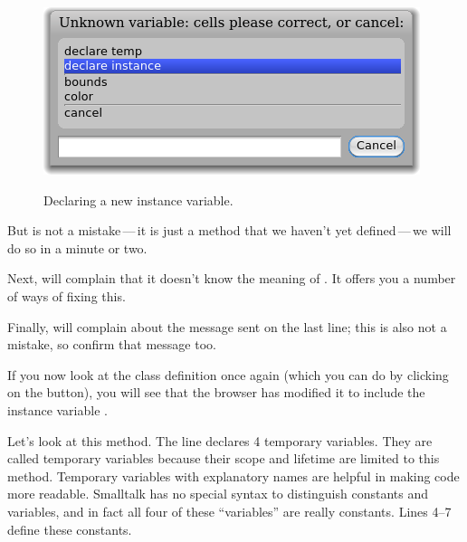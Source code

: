 \documentclass[a4paper,10pt,twoside]{book}
\begin{document}
\begin{figure}[htb]
\begin{minipage}{0.48\textwidth}
		{\includegraphics[scale=0.7]{DeclareInstanceVar}}
	\caption{Declaring a new instance variable.}
\end{minipage}
\end{figure}

But  is not a mistake\,---\,it is just a method that we haven't yet defined\,---\,we will do so in a minute or two.


Next, \pharo will complain that it doesn't know the meaning of .  It offers you a number of ways of fixing this.

Finally, \pharo will complain about the message  sent on the last line; this is also not a mistake, so confirm that message too.

If you now look at the class definition once again (which you can do by clicking on the  button), you will see that the browser has modified it to include the instance variable .

Let's look at this  method.
The line   declares 4 temporary variables. They are called temporary variables because their scope and lifetime are limited to this method.  Temporary variables with explanatory names are helpful in making code more readable.  Smalltalk has no special syntax to distinguish constants and variables, and in fact all four of these ``variables'' are really constants. 
Lines 4--7 define these constants.
\end{document}
